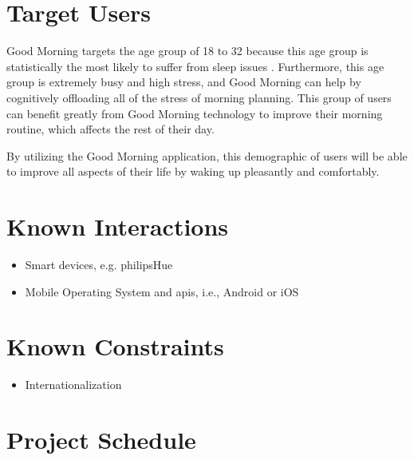 \documentclass[11pt]{article}
\begin{document}
\section{Target Users}\label{target-users}

Good Morning targets the age group of 18 to 32 because this age group is statistically the most likely to suffer from sleep issues \cite{sleepdisorders}. Furthermore, this age group is extremely busy and high stress, and Good Morning can help by cognitively offloading all of the stress of morning planning. This group of users can benefit greatly from Good Morning technology to improve their morning routine, which affects the rest of their day.

By utilizing the Good Morning application, this demographic of users will be able to improve all aspects of their life by waking up pleasantly and comfortably.

%
\section{Known Interactions}\label{known-interactions}

\begin{itemize}
\item
  Smart devices, e.g. \gls{philipsHue}
\item
  Mobile Operating System and \glspl{api}, i.e., Android or iOS
\end{itemize}


%
\section{Known Constraints}\label{known-constraints}

\begin{itemize}
 \item Internationalization
\end{itemize}


%
\section{Project Schedule}\label{project-schedule}
\end{document}

